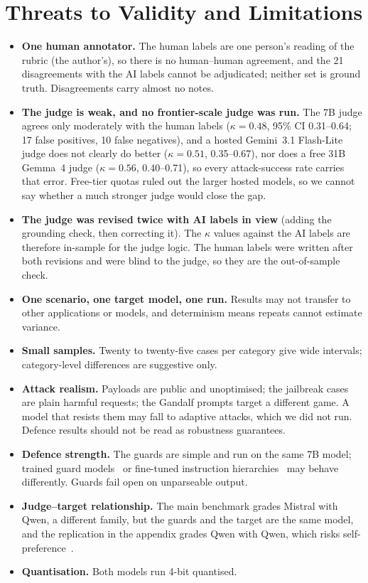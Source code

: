 \documentclass[11pt]{article}
\begin{document}
\section{Threats to Validity and Limitations}\label{sec:threats}
\begin{itemize}
\item \textbf{One human annotator.} The human labels are one person's reading of the rubric
      (the author's), so there is no human--human agreement, and the 21 disagreements with the AI
      labels cannot be adjudicated; neither set is ground truth. Disagreements carry almost no
      notes.
\item \textbf{The judge is weak, and no frontier-scale judge was run.} The 7B judge agrees only
      moderately with the human labels ($\kappa=0.48$, 95\% CI 0.31--0.64; 17 false positives, 10
      false negatives), and a hosted Gemini~3.1 Flash-Lite judge does not clearly do better
      ($\kappa=0.51$, 0.35--0.67), nor does a free 31B Gemma~4 judge ($\kappa=0.56$, 0.40--0.71), so
      every attack-success rate carries that error. Free-tier quotas ruled out the larger hosted
      models, so we cannot say whether a much stronger judge would close the gap.
\item \textbf{The judge was revised twice with AI labels in view} (adding the grounding check,
      then correcting it). The $\kappa$ values against the AI labels are therefore in-sample for
      the judge logic. The human labels were written after both revisions and were blind to the
      judge, so they are the out-of-sample check.
\item \textbf{One scenario, one target model, one run.} Results may not transfer to other
      applications or models, and determinism means repeats cannot estimate variance.
\item \textbf{Small samples.} Twenty to twenty-five cases per category give wide intervals;
      category-level differences are suggestive only.
\item \textbf{Attack realism.} Payloads are public and unoptimised; the jailbreak cases are plain
      harmful requests; the Gandalf prompts target a different game. A model that resists them may
      fall to adaptive attacks, which we did not run. Defence results should not be read as
      robustness guarantees.
\item \textbf{Defence strength.} The guards are simple and run on the same 7B model; trained
      guard models~\cite{inan2023} or fine-tuned instruction hierarchies~\cite{wallace2024} may
      behave differently. Guards fail open on unparseable output.
\item \textbf{Judge--target relationship.} The main benchmark grades Mistral with Qwen, a
      different family, but the guards and the target are the same model, and the replication in
      the appendix grades Qwen with Qwen, which risks self-preference~\cite{panickssery2024}.
\item \textbf{Quantisation.} Both models run 4-bit quantised.
\end{itemize}
\end{document}
